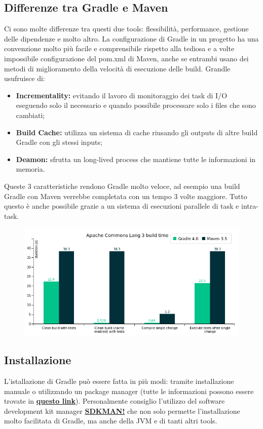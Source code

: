 \documentclass{article}
\begin{document}
\begin{flushleft}
\subsection{Differenze tra Gradle e Maven} %
Ci sono molte differenze tra questi due tools: flessibilità, performance, gestione delle dipendenze e molto altro. La configurazione di Gradle in un progetto ha una convenzione molto più facile e comprensibile rispetto alla tediosa e a volte impossibile configurazione del pom.xml di Maven, anche se entrambi usano dei metodi di miglioramento della velocità di esecuzione delle build. Grandle usufruisce di:
\begin{itemize}
    \item \textbf{Incrementality:} evitando il lavoro di monitoraggio dei task di I/O eseguendo solo il necessario e quando possibile processare solo i files che sono cambiati;
    \item \textbf{Build Cache:} utilizza un sistema di cache riusando gli outputs di altre build Gradle con gli stessi inputs;
    \item \textbf{Deamon:} sfrutta un long-lived process che mantiene tutte le informazioni in memoria.
\end{itemize}
Queste 3 caratteristiche rendono Gradle molto veloce, ad esempio una build Gradle con Maven verrebbe completata con un tempo 3 volte maggiore. Tutto questo è anche possibile grazie a un sistema di esecuzioni parallele di task e intra-task.
\begin{figure}[H]
\includegraphics[scale=0.70]{performance.png}
\end{figure} 

\subsection{Installazione}
L'istallazione di Gradle può essere fatta in più modi: tramite installazione manuale o utilizzando un package manager (tutte le informazioni possono essere trovate in \textbf{\href{https://gradle.org/install/}{questo link}}). Personalmente consiglio l'utilizzo del software development kit manager \textbf{\href{http://sdkman.io/}{SDKMAN!}} che non solo permette l'installazione molto facilitata di Gradle, ma anche della JVM e di tanti altri tools.


\end{flushleft}
\end{document}

